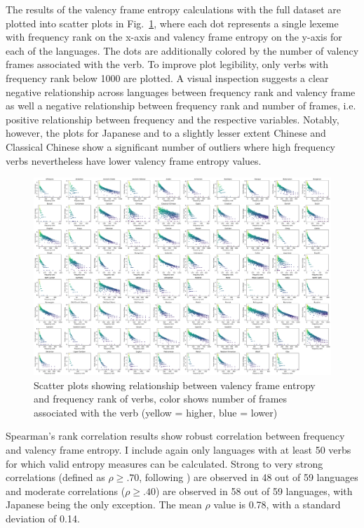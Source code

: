 The results of the valency frame entropy calculations with the full dataset are plotted into scatter plots in Fig.~\ref{fig:joint_entropy_freq}, where each dot represents a single lexeme with frequency rank on the x-axis and valency frame entropy on the y-axis for each of the languages. The dots are additionally colored by the number of valency frames associated with the verb. To improve plot legibility, only verbs with frequency rank below 1000 are plotted. A visual inspection suggests a clear negative relationship across languages between frequency rank and valency frame as well a negative relationship between frequency rank and number of frames, i.e. positive relationship between frequency and the respective variables. Notably, however, the plots for Japanese and to a slightly lesser extent Chinese and Classical Chinese show a significant number of outliers where high frequency verbs nevertheless have lower valency frame entropy values. 

\begin{figure}
  \centering
  \includegraphics[width=\textwidth]{figures/exp2/joint_entropy_freq.pdf}
  \caption{Scatter plots showing relationship between valency frame entropy and frequency rank of verbs, color shows number of frames associated with the verb (yellow = higher, blue = lower)}
  \label{fig:joint_entropy_freq}
\end{figure}

Spearman's rank correlation results show robust correlation between frequency and valency frame entropy. I include again only languages with at least 50 verbs for which valid entropy measures can be calculated. Strong to very strong correlations (defined as $\rho\geq.70$, following \citealp{schober2018}) are observed in 48 out of 59 languages and moderate correlations ($\rho\geq.40$) are observed in 58 out of 59 languages, with Japanese being the only exception.  The mean $\rho$ value is 0.78, with a standard deviation of 0.14.

